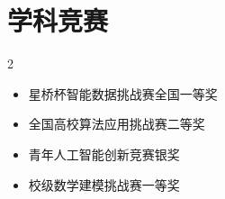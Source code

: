 \documentclass{claritycv}
\begin{document}
\section{学科竞赛}
\begin{multicols}{2}
\begin{itemize}[label={\color{ResumePrimary}\faTrophy}]
  \item 星桥杯智能数据挑战赛全国一等奖
  \item 全国高校算法应用挑战赛二等奖
  \item 青年人工智能创新竞赛银奖
  \item 校级数学建模挑战赛一等奖
\end{itemize}
\end{multicols}
\end{document}
